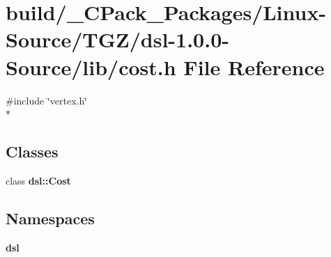 \section{build/\-\_\-\-C\-Pack\-\_\-\-Packages/\-Linux-\/\-Source/\-T\-G\-Z/dsl-\/1.0.0-\/\-Source/lib/cost.h File Reference}
\label{build_2__CPack__Packages_2Linux-Source_2TGZ_2dsl-1_80_80-Source_2lib_2cost_8h}
{\ttfamily \#include \char`\"{}vertex.\-h\char`\"{}}\\*
\subsection*{Classes}
\begin{DoxyCompactItemize}
\item 
class {\bf dsl\-::\-Cost}
\end{DoxyCompactItemize}
\subsection*{Namespaces}
\begin{DoxyCompactItemize}
\item 
{\bf dsl}
\end{DoxyCompactItemize}
